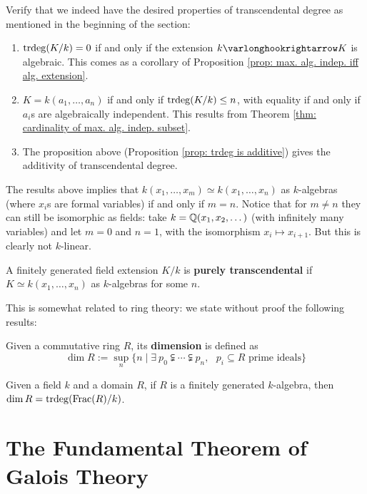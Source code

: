 \documentclass{article}
\begin{document}
Verify that we indeed have the desired properties of transcendental degree as mentioned in the beginning of the section:
\begin{enumerate}[label=\arabic*)]
    \item $\operatorname{trdeg}(K/k) = 0$ if and only if the extension $k \ext K$ is algebraic. This comes as a corollary of Proposition \ref{prop: max. alg. indep. iff alg. extension}.
    \item $K = k(a_1, \dots, a_n)$ if and only if $\operatorname{trdeg}(K/k) \leq n$, with equality if and only if $a_i$s are algebraically independent. This results from Theorem \ref{thm: cardinality of max. alg. indep. subset}.
    \item The proposition above (Proposition \ref{prop: trdeg is additive}) gives the additivity of transcendental degree.
\end{enumerate}

\begin{remark}
    The results above implies that $k(x_1, \dots, x_m) \simeq k(x_1, \dots, x_n)$ as $k$-algebras (where $x_i$s are formal variables) if and only if $m = n$. Notice that for $m \neq n$ they can still be isomorphic as fields: take $k = \mathbb{Q}(x_1, x_2, \dots)$ (with infinitely many variables) and let $m = 0$ and $n = 1$, with the isomorphism $x_i \mapsto x_{i+1}$. But this is clearly not $k$-linear. 
\end{remark}

\begin{definition}
    A finitely generated field extension $K/k$ is \textbf{purely transcendental} if $K \simeq k(x_1, \dots, x_n)$ as $k$-algebras for some $n$. 
\end{definition}

This is somewhat related to ring theory: we state without proof the following results:

\begin{definition}
    Given a commutative ring $R$, its \textbf{dimension} is defined as
    \[
        \dim R := \sup_n \{ n \mid \exists\ p_0 \subsetneqq \cdots \subsetneqq p_n, \text{ $p_i \subseteq R$ prime ideals} \}
    \]
\end{definition}

\begin{theorem}
    Given a field $k$ and a domain $R$, if $R$ is a finitely generated $k$-algebra, then $\dim R = \operatorname{trdeg}(\mathrm{Frac}(R)/k)$.
\end{theorem}

\section{The Fundamental Theorem of Galois Theory}
\end{document}
